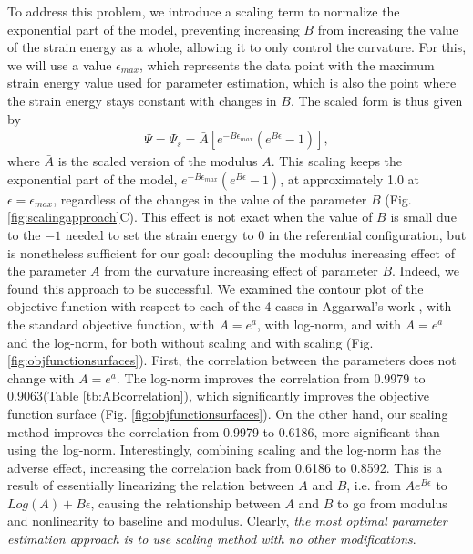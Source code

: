 	To address this problem, we introduce a scaling term to normalize the exponential part of the model, preventing increasing $B$ from increasing the value of the strain energy as a whole, allowing it to only control the curvature. For this, we will use a value $\epsilon_{max}$, which represents the data point with the maximum strain energy value used for parameter estimation, which is also the point where the strain energy stays constant with changes in $B$. The scaled form is thus given by
\begin{equation}
\begin{aligned}
\Psi = \Psi_s = \bar{A} \left[e^{-B\epsilon_{max}} \left( e^{B\epsilon} - 1\right)\right],\label{eqn:scaledmodel1D}
\end{aligned}
\end{equation}
    where $\bar{A}$ is the scaled version of the modulus $A$. This scaling keeps the exponential part of the model, $e^{-B\epsilon_{max}} ( e^{B\epsilon} - 1)$, at approximately 1.0 at $\epsilon = \epsilon_{max}$, regardless of the changes in the value of the parameter $B$ (Fig. \ref{fig:scalingapproach}C). This effect is not exact when the value of $B$ is small due to the $-1$ needed to set the strain energy to 0 in the referential configuration, but is nonetheless sufficient for our goal: decoupling the modulus increasing effect of the parameter $A$ from the curvature increasing effect of parameter $B$. Indeed, we found this approach to be successful. We examined the contour plot of the objective function with respect to each of the 4 cases in Aggarwal's work \cite{aggarwal_improved_2017}, with the standard objective function, with $A=e^{a}$, with log-norm, and with $A=e^{a}$ and the log-norm, for both without scaling and with scaling (Fig. \ref{fig:objfunctionsurfaces}). First, the correlation between the parameters does not change with $A=e^{a}$. The log-norm improves the correlation from 0.9979 to 0.9063(Table \ref{tb:ABcorrelation}), which significantly improves the objective function surface (Fig. \ref{fig:objfunctionsurfaces}). On the other hand, our scaling method improves the correlation from 0.9979 to 0.6186, more significant than using the log-norm. Interestingly, combining scaling and the log-norm has the adverse effect, increasing the correlation back from 0.6186 to 0.8592. This is a result of essentially linearizing the relation between $A$ and $B$, i.e. from $Ae^{B\epsilon}$ to $Log(A)+B\epsilon$, causing the relationship between $A$ and $B$ to go from modulus and nonlinearity to baseline and modulus. Clearly, \emph{the most optimal parameter estimation approach is to use scaling method with no other modifications}. 
    
